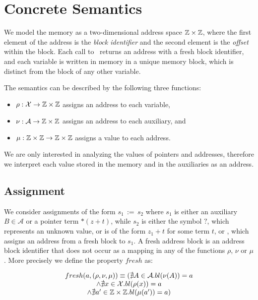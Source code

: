 \chapter{Concrete Semantics} \label{chapter:concrete_semantics}

We model the memory as a two-dimensional address space $\mathbb{Z} \times \mathbb{Z}$,
where the first element of the address is the \emph{block identifier} and the second element is the \emph{offset} within the block.
Each call to \malloc\ returns an address with a fresh block identifier, and each variable is written in memory in a unique memory block,
which is distinct from the block of any other variable.

The semantics can be described by the following three functions:
\begin{itemize}
    \item $\rho : \mathcal{X} \rightarrow \mathbb{Z} \times \mathbb{Z}$ assigns an address to each variable,
    \item $\nu : \mathcal{A} \rightarrow \mathbb{Z} \times \mathbb{Z}$ assigns an address to each auxiliary, and
    \item $\mu : \mathbb{Z} \times \mathbb{Z} \rightarrow \mathbb{Z} \times \mathbb{Z}$ assigns a value to each address.
\end{itemize}
We are only interested in analyzing the values of pointers and addresses, therefore we interpret each value stored in the memory and in the auxiliaries as an address.

\section{Assignment}

We consider assignments of the form $s_1\,{:=}\,s_2$ where $s_1$ is either an auxiliary $B \in \mathcal{A}$ or a pointer term $*(z+t)$, while $s_2$ is either the symbol $?$, which represents an unknown value, or is of the form $z_1 + t$ for some term $t$, or \malloc, which assigns an address from a fresh block to $s_1$.
A fresh address block is an address block identifier that does not occur as a mapping in any of the functions $\rho$, $\nu$ or $\mu$.
More precisely we define the property $fresh$ as:

\[ \begin{array}{c}
        fresh(a, (\rho,\nu,\mu)) \equiv
        (\nexists A\in \mathcal{A} . bl(\nu(A)) = a      \\
        \land \nexists x\in \mathcal{X}. bl(\rho(x)) = a \\
        \land \nexists a'\in \mathbb{Z} \times \mathbb{Z} . bl(\mu(a')) = a)
    \end{array}
\]

